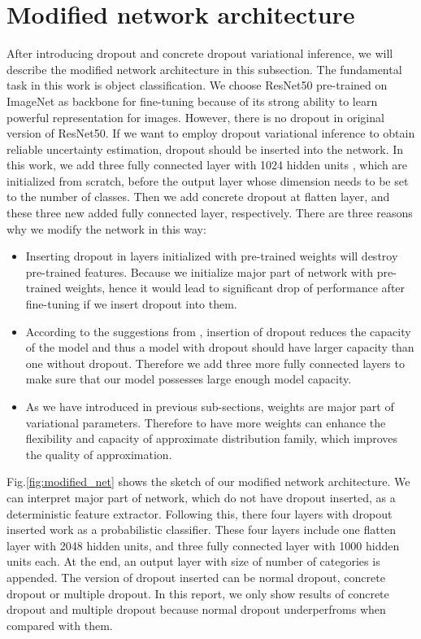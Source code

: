 \section{Modified network architecture}
After introducing dropout and concrete dropout variational inference, we will describe the modified network architecture in this subsection. The fundamental task in this work is object classification. We choose ResNet50\cite{he2016deep} pre-trained on ImageNet as backbone for fine-tuning because of its strong ability to learn powerful representation for images. However, there is no dropout in original version of ResNet50. If we want to employ dropout variational inference to obtain reliable uncertainty estimation, dropout should be inserted into the network. In this work, we add three fully connected layer with 1024 hidden units , which are initialized from scratch, before the output layer whose dimension needs to be set to the number of classes. Then we add concrete dropout at flatten layer, and these three new added fully connected layer, respectively.
There are three reasons why we modify the network in this way:
\begin{itemize}
	\item Inserting dropout in layers initialized with pre-trained weights will destroy pre-trained features. Because we initialize major part of network with pre-trained weights, hence it would lead to significant drop of performance after fine-tuning if we insert dropout into them. 
	\item According to the suggestions from \cite{srivastava2014dropout}, insertion of dropout reduces the capacity of the model and thus a model with	dropout should have larger capacity than one without dropout. Therefore we add three more fully connected layers to make sure that our model possesses large enough model capacity.
	\item As we have introduced in previous sub-sections, weights are major part of variational parameters. Therefore to have more weights can enhance the flexibility and capacity of approximate distribution family, which improves the quality of approximation.  
\end{itemize}

Fig.\ref{fig:modified_net} shows the sketch of our modified network architecture. We can interpret major part of network, which do not have dropout inserted, as a deterministic feature extractor. Following this, there four layers with dropout inserted work as a probabilistic classifier. These four layers include one flatten layer with 2048 hidden units, and three fully connected layer with 1000 hidden units each. At the end, an output layer with size of number of categories is appended. The version of dropout inserted can be normal dropout, concrete dropout or multiple dropout. In this report, we only show results of concrete dropout and multiple dropout because normal dropout underperfroms when compared with them.   

